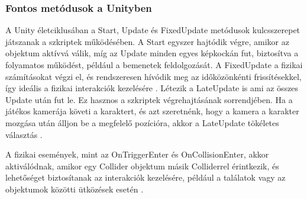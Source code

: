 \documentclass[
]{thesis-ekf}
\theoremstyle{definition}
\theoremstyle{remark}
\begin{document}
\subsubsection{Fontos metódusok a Unityben}
A Unity életciklusában a Start, Update és FixedUpdate metódusok kulcsszerepet játszanak a szkriptek működésében. A Start egyszer hajtódik végre, amikor az objektum aktívvá válik, míg az Update minden egyes képkockán fut, biztosítva a folyamatos működést, például a bemenetek feldolgozását. A FixedUpdate a fizikai számításokat végzi el, és rendszeresen hívódik meg az időközönkénti frissítésekkel, így ideális a fizikai interakciók kezelésére \cite{UnityEvents}. Létezik a LateUpdate is ami az összes Update után fut le. Ez hasznos a szkriptek végrehajtásának sorrendjében. Ha a játékos kamerája követi a karaktert, és azt szeretnénk, hogy a kamera a karakter mozgása után álljon be a megfelelő pozícióra, akkor a LateUpdate tökéletes választás \cite{UnityLateUpdate}.

A fizikai események, mint az OnTriggerEnter és OnCollisionEnter, akkor aktiválódnak, amikor egy Collider objektum másik Colliderrel érintkezik, és lehetőséget biztosítanak az interakciók kezelésére, például a találatok vagy az objektumok közötti ütközések esetén \cite{UnityEvents}.
\end{document}
